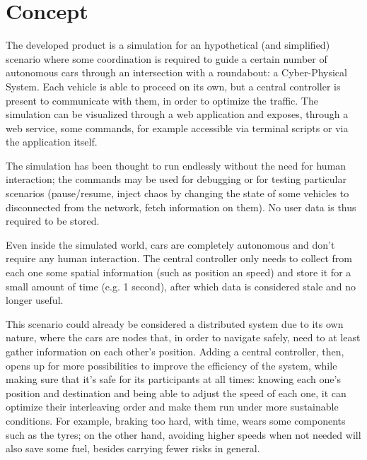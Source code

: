 \section{Concept}\label{concept}

The developed product is a simulation for an hypothetical (and simplified)
scenario where some coordination is required to guide a certain number of
autonomous cars through an intersection with a roundabout: a Cyber-Physical
System. Each vehicle is able to proceed on its own, but a central controller is
present to communicate with them, in order to optimize the traffic. The
simulation can be visualized through a web application and exposes, through a
web service, some commands, for example accessible via terminal scripts or via
the application itself.

The simulation has been thought to run endlessly without the need for human
interaction; the commands may be used for debugging or for testing particular
scenarios (pause/resume, inject chaos by changing the state of some vehicles to
disconnected from the network, fetch information on them). No user data is thus
required to be stored.

Even inside the simulated world, cars are completely autonomous and don't
require any human interaction. The central controller only needs to collect from
each one some spatial information (such as position an speed) and store it for a
small amount of time (e.g. 1 second), after which data is considered stale and
no longer useful.

This scenario could already be considered a distributed system due to its own
nature, where the cars are nodes that, in order to navigate safely, need to at
least gather information on each other's position. Adding a central controller,
then, opens up for more possibilities to improve the efficiency of the system,
while making sure that it's safe for its participants at all times: knowing each
one's position and destination and being able to adjust the speed of each one,
it can optimize their interleaving order and make them run under more
sustainable conditions. For example, braking too hard, with time, wears some
components such as the tyres; on the other hand, avoiding higher speeds when not
needed will also save some fuel, besides carrying fewer risks in general.
